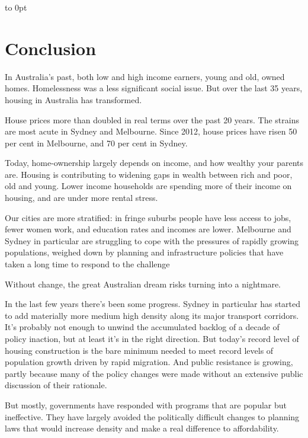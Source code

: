 \newenvironment{Conclusion}%
  {\onecolumn\vtop to 0pt\bgroup\vspace{-25pt}\chapter{Conclusion\label{chap:Conclusion}}\begin{multicols}{2}}%
  {\end{multicols}\vss\egroup\hfill\twocolumn}

\begin{Conclusion}
In Australia’s past, both low and high income earners, young and old, owned homes. Homelessness was a less significant social issue. But over the last 35 years, housing in Australia has transformed. 

House prices more than doubled in real terms over the past 20 years. The strains are most acute in Sydney and Melbourne. Since 2012, house prices have risen 50 per cent in Melbourne, and 70 per cent in Sydney.

Today, home-ownership largely depends on income, and how wealthy your parents are. Housing is contributing to widening gaps in wealth between rich and poor, old and young. 
Lower income households are spending more of their income on housing, and are under more rental stress. 

Our cities are more stratified: in fringe suburbs people have less access to jobs, fewer women work, and education rates and incomes are lower. Melbourne and Sydney in particular are struggling to cope with the pressures of rapidly growing populations, weighed down by planning and infrastructure policies that have taken a long time to respond to the challenge 

Without change, the great Australian dream risks turning into a nightmare. 

In the last few years there’s been some progress. Sydney in particular has started to add materially more medium high density along its major transport corridors. It’s probably not enough to unwind the accumulated backlog of a decade of policy inaction, but at least it’s in the right direction. But today’s record level of housing construction is the bare minimum needed to meet record levels of population growth driven by rapid migration. And public resistance is growing, partly because many of the policy changes were made without an extensive public discussion of their rationale.

But mostly, governments have responded with programs that are popular but ineffective. They have largely avoided the politically difficult changes to planning laws that would increase density and make a real difference to affordability.


\end{Conclusion}
